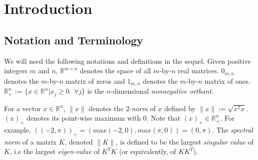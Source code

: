 \documentclass[a4paper,9pt,journal]{IEEEtran}
\begin{document}
\section{Introduction}
\label{sec:intro}


\subsection{Notation and Terminology}
\label{sec:notation}
We will need the following notations and definitions in the sequel. Given positive integers $m$ and $n$, $\mathbb{R}^{m \times n}$ denotes
the space of all $m$-by-$n$ real matrices. $0_{m,n}$ denotes the $m$-by-$n$ matrix of zeros and $1_{m,n}$ denotes the $m$-by-$n$ matrix of ones.
$\mathbb{R}^n_+$ := $\{x \in \mathbb{R}^n|x_j \ge 0 \text{ }  \forall j\}$ is the $n$-dimensional \textit{nonnegative orthant}.

For a vector $x \in \mathbb{R}^n$, $\|x\|$ denotes the $2$-\textit{norm} of $x$ defined by $\|x\| := \sqrt{x^Tx}$.
$(x)_+$ denotes its point-wise maximum with 0. Note that $(x)_+ \in \mathbb{R}^n_+$.
For example, $((-2, \pi))_+ = (max(-2, 0), max(\pi, 0)) = (0, \pi)$. The \textit{spectral norm} of a matrix $K$,
denoted $\|K\|$, is defined to be the largest \textit{singular value} of $K$, i.e the largest \textit{eigen-value} of $K^TK$ (or equivalently, of $KK^T$).
\end{document}
